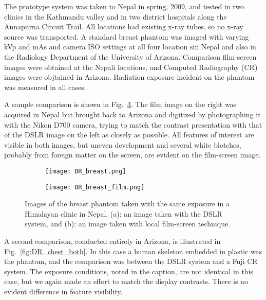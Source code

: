 The prototype system was taken to Nepal in spring, 2009, and tested in two clinics in the Kathmandu valley and in two district hospitals along the Annapurna Circuit Trail.  All locations had existing x-ray tubes, so no x-ray source was transported. A standard breast phantom was imaged with varying kVp and mAs and camera ISO settings at all four location sin Nepal and also in the Radiology Department of the University of Arizona.  Comparison film-screen images were obtained at the Nepali locations, and Computed Radiography (CR) images were objtained in Arizona.  Radiation exposure incident on the phantom was measured in all cases.

A sample comparison is shown in Fig.~\ref{fig:DR_breast_both}. The film image on the right was acquired in Nepal but brought back to Arizona and digitized by photographing it with the Nikon D700 camera, trying to match the contrast presentation with that of the DSLR image on the left as closely as possible. All features of interest are visible in both images, but uneven development and several white blotches, probably from foreign matter on the screen, are evident on the film-screen image.

\begin{figure}[h]
\centering
	\begin{subfigure}[b]{0.4\linewidth}
		\texttt{[image: DR\_breast.png]}
		\caption{}
		\label{fig:DR_breast}
	\end{subfigure}
	\hspace{1 cm}
	\begin{subfigure}[b]{0.4\linewidth}
		\texttt{[image: DR\_breast\_film.png]}
		\caption{}
		\label{fig:DR_breast_film}
	\end{subfigure}
	\caption{Images of the breast phantom taken with the same exposure in a Himalayan clinic in Nepal, (a): an image taken with the DSLR system, and (b): an image taken with local film-screen technique.}
	\label{fig:DR_breast_both}
\end{figure}

A second comparison, conducted entirely in Arizona, is illustrated in Fig.~\ref{fig:DR_chest_both}. In this case a human skeleton embedded in plastic was the phantom, and the comparison was between the DSLR system and a Fuji CR system. The exposure conditions, noted in the caption, are not identical in this case, but we again made an effort to match the display contrasts. There is no evident difference in feature visibility.

